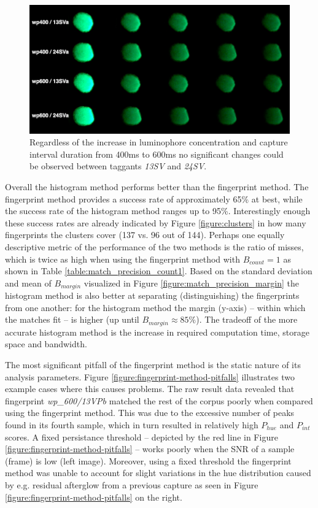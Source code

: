 \documentclass[thesis.tex]{subfiles}
\begin{document}
\begin{figure}[h!]
  \centering \includegraphics[page=1,width=\textwidth]{images/findings/SV}
  \caption{Regardless of the increase in luminophore concentration and capture interval duration from 400ms to 600ms no significant changes could be observed between taggants \emph{13SV} and \emph{24SV}.}
  \label{figure:SV}
\end{figure}

Overall the histogram method performs better than the fingerprint method. The fingerprint method provides a success rate of approximately 65\% at best, while the success rate of the histogram method ranges up to 95\%. Interestingly enough these success rates are already indicated by Figure \ref{figure:clusters} in how many fingerprints the clusters cover (137 vs. 96 out of 144). Perhaps one equally descriptive metric of the performance of the two methods is the ratio of misses, which is twice as high when using the fingerprint method with $B_{count} = 1$ as shown in Table \ref{table:match_precision_count1}. Based on the standard deviation and mean of $B_{margin}$ visualized in Figure \ref{figure:match_precision_margin} the histogram method is also better at separating (distinguishing) the fingerprints from one another: for the histogram method the margin (y-axis) -- within which the matches fit -- is higher (up until $B_{margin} \approx 85\%$). The tradeoff of the more accurate histogram method is the increase in required computation time, storage space and bandwidth.

The most significant pitfall of the fingerprint method is the static nature of its analysis parameters. Figure \ref{figure:fingerprint-method-pitfalls} illustrates two example cases where this causes problems. The raw result data revealed that fingerprint \emph{wp\_600/13VPb} matched the rest of the corpus poorly when compared using the fingerprint method. This was due to the excessive number of peaks found in its fourth sample, which in turn resulted in relatively high $P_{hue}$ and $P_{int}$ scores. A fixed persistance threshold -- depicted by the red line in Figure \ref{figure:fingerprint-method-pitfalls} -- works poorly when the SNR of a sample (frame) is low (left image). Moreover, using a fixed threshold the fingerprint method was unable to account for slight variations in the hue distribution caused by e.g. residual afterglow from a previous capture as seen in Figure \ref{figure:fingerprint-method-pitfalls} on the right.
\end{document}
